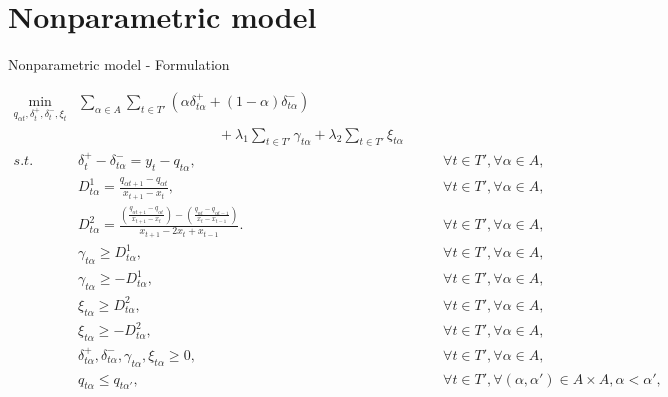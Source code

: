 \section{Nonparametric model}\label{nonparametric-model}

\begin{frame}{Nonparametric model - Formulation}

\tiny

\begin{eqnarray}
\min_{q_{\alpha t},\delta^+_{t}, \delta_t^-, \xi_t} & \sum_{\alpha \in A} \sum_{t \in T'}\left(\alpha\delta_{t \alpha }^{+}+(1-\alpha)\delta_{t \alpha }^{-}\right) & \\
& \qquad \qquad \qquad \qquad \qquad + \lambda_1\sum_{t \in T'}\gamma_{t \alpha } + \lambda_2\sum_{t \in T'}\xi_{t \alpha } & \nonumber \\
s.t. & \delta_{t}^{+}-\delta_{t \alpha }^{-}=y_{t}-q_{t \alpha }, & \qquad\forall t \in T',\forall \alpha \in A,\\
   & D^{1}_{t \alpha }=\frac{q_{\alpha t+1}-q_{\alpha t}}{x_{t+1}-x_{t}},
    & \qquad\forall t \in T',\forall \alpha \in A,\\   
 & D^{2}_{t \alpha }=\frac{\left(\frac{q_{\alpha t+1}-q_{\alpha t}}{x_{t+1}-x_{t}}\right)-\left(\frac{q_{\alpha t}-q_{\alpha t-1}}{x_{t}-x_{t-1}}\right)}{x_{t+1}-2x_{t} + x_{t-1}}.
  & \qquad\forall t \in T',\forall \alpha \in A,\\
 & \gamma_{t \alpha}\geq D^1_{t \alpha }, & \qquad\forall t \in T',\forall \alpha \in A,\\
  & \gamma_{t \alpha}\geq-D^1_{t \alpha}, & \qquad\forall t \in T',\forall \alpha \in A,\\
  & \xi_{t \alpha}\geq D^2_{t \alpha }, & \qquad\forall t \in T',\forall \alpha \in A,\\
 & \xi_{t \alpha}\geq-D^2_{t \alpha}, & \qquad\forall t \in T',\forall \alpha \in A,\\
 & \delta_{t \alpha}^{+},\delta_{t \alpha}^{-},\gamma_{t \alpha}, \xi_{t \alpha}\geq0, & \qquad\forall t \in T',\forall \alpha \in A,\\
  & q_{t \alpha} \leq q_{t \alpha'}, & \qquad \forall t \in T', \forall (\alpha, \alpha') \in A \times A, \alpha < \alpha',\nonumber \\  
  \end{eqnarray}

\end{frame}

